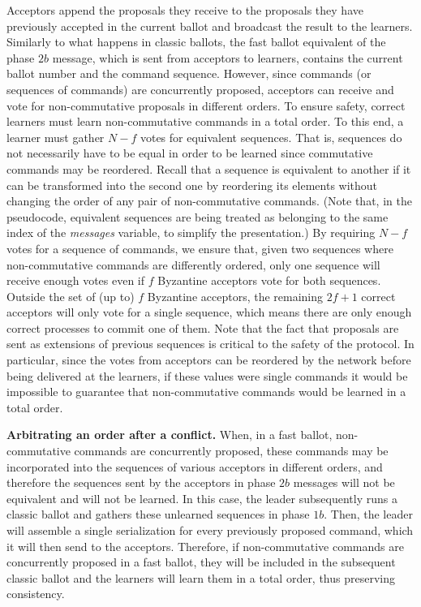 Acceptors append the proposals they receive to the proposals they have previously accepted in the current ballot and broadcast the result to the learners. Similarly to what happens in classic ballots, the fast ballot equivalent of the phase $2b$ message, which is sent from acceptors to learners, contains the current ballot number and the command sequence. However, since commands (or sequences of commands) are concurrently proposed, acceptors can receive and vote for non-commutative proposals in different orders. To ensure safety, correct learners must learn non-commutative commands in a total order. To this end, a learner must gather $N-f$ votes for equivalent sequences. That is, sequences do not necessarily have to be equal in order to be learned since commutative commands may be reordered. Recall that a sequence is equivalent to another if it can be transformed into the second one by reordering its elements without changing the order of any pair of non-commutative commands. (Note that, in the pseudocode, equivalent sequences are being treated as belonging to the same index of the \emph{messages} variable, to simplify the presentation.) By requiring $N-f$ votes for a sequence of commands, we ensure that, given two sequences where non-commutative commands are differently ordered, only one sequence will receive enough votes even if $f$ Byzantine acceptors vote for both sequences. Outside the set of (up to) $f$ Byzantine acceptors, the remaining $2f+1$ correct acceptors will only vote for a single sequence, which means there are only enough correct processes to commit one of them. Note that the fact that proposals are sent as extensions of previous sequences is critical to the safety of the protocol. In particular, since the votes from acceptors can be reordered by the network before being delivered at the learners, if these values were single commands it would be impossible to guarantee that non-commutative commands would be learned in a total order. \par
\noindent \textbf{Arbitrating an order after a conflict.} When, in a fast ballot, non-commutative commands are  concurrently proposed, these commands may be incorporated into the sequences of various acceptors in different orders, and therefore the sequences sent by the acceptors in phase $2b$ messages will not be equivalent and will not be learned. In this case, the leader subsequently runs a classic ballot and gathers these unlearned sequences in phase $1b$. Then, the leader will assemble a single serialization for every previously proposed command, which it will then send to the acceptors. Therefore, if non-commutative commands are concurrently proposed in a fast ballot, they will be included in the subsequent classic ballot and the learners will learn them in a total order, thus preserving consistency.
